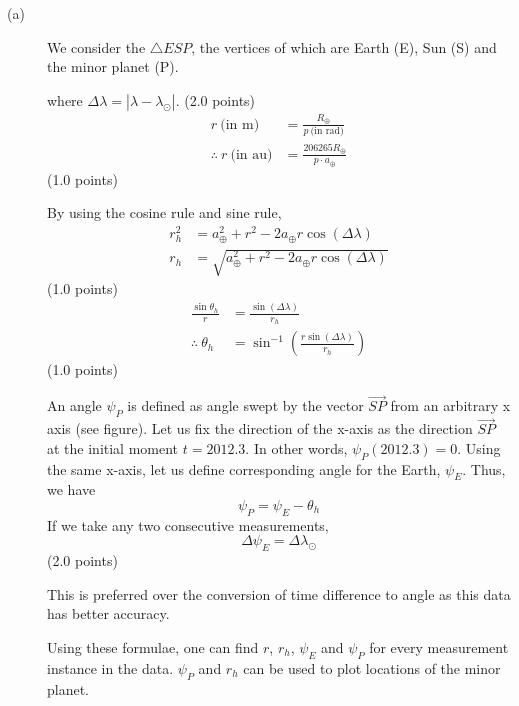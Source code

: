 \begin{description}
\item[(a)] We consider the $\triangle ESP$, the vertices of which are Earth
  (E), Sun (S) and the minor planet (P).


  where $\Delta\lambda = |\lambda - \lambda_\odot|$. \hfill(2.0 points)
  \begin{align*}
    r\ \text{(in m)} &= \frac{R_\oplus}{p\ \text{(in rad)}} \\
    \therefore\ r\ \text{(in au)} &= \frac{206265 R_\oplus}{p\cdot a_\oplus}
  \end{align*}
  \hfill(1.0 points)

  By using the cosine rule and sine rule,
  \begin{align*}
    r_h^2 &= a_\oplus^2 + r^2 - 2a_\oplus r\cos(\Delta\lambda) \\
    r_h &= \sqrt{a_\oplus^2 + r^2 - 2a_\oplus r\cos(\Delta\lambda)}
  \end{align*}
  \hfill(1.0 points)
  \begin{align*}
    \frac{\sin\theta_h}{r} &= \frac{\sin(\Delta\lambda)}{r_h} \\
    \therefore\ \theta_h &=
      \sin^{-1}\left(\frac{r\sin(\Delta\lambda)}{r_h}\right)
  \end{align*}
  \hfill(1.0 points)

  An angle $\psi_P$ is defined as angle swept by the vector
  $\overrightarrow{SP}$ from an arbitrary x axis (see figure). Let us fix the
  direction of the x-axis as the direction $\overrightarrow{SP}$ at the
  initial moment $t = 2012.3$. In other words, $\psi_P(2012.3) = 0$. Using the
  same x-axis, let us define corresponding angle for the Earth,
  $\psi_E$. Thus, we have
  \[
    \psi_P = \psi_E - \theta_h
  \]
  If we take any two consecutive measurements,
  \[
    \Delta\psi_E = \Delta\lambda_\odot
  \]
  \hfill(2.0 points)

  This is preferred over the conversion of time difference to angle as this
  data has better accuracy.

  Using these formulae, one can find $r$, $r_h$, $\psi_E$ and $\psi_P$ for
  every measurement instance in the data. $\psi_P$ and $r_h$ can be used to
  plot locations of the minor planet.


\end{description}

